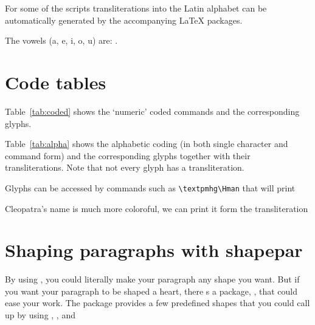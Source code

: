 {    For some of the scripts transliterations into the Latin alphabet can
be automatically generated by the accompanying LaTeX packages.

  The vowels (a, e, i, o, u) are: \textcypr{\Ca{} \Ce{} \Ci{} \Co{} \Cu}.



\section{Code tables}

Table~\ref{tab:coded} 
shows the `numeric' coded commands and the corresponding
glyphs. 

Table~\ref{tab:alpha} 
shows the alphabetic coding (in both single
character and command form) and the corresponding glyphs together with their
transliterations. Note that not every glyph has a transliteration.

Glyphs can be accessed by commands such as \verb+\textpmhg\Hman+ that will print \textpmhg\Hman
\medskip

\begin{center}
     {\Large\textpmhg\Hman\textpmhg\Hman\textpmhg\Hman}   
\end{center}

Cleopatra's name is much more coloroful, we can print it form the transliteration



\begin{center}
  \Large{}
\end{center}



\section{Shaping paragraphs with shapepar}

By using , you could literally make your paragraph any shape you want.
But if you want your paragraph to be shaped a heart, there s a package, , that
could ease your work. The package provides a few predefined shapes that you could call
up by using , , and 

}
